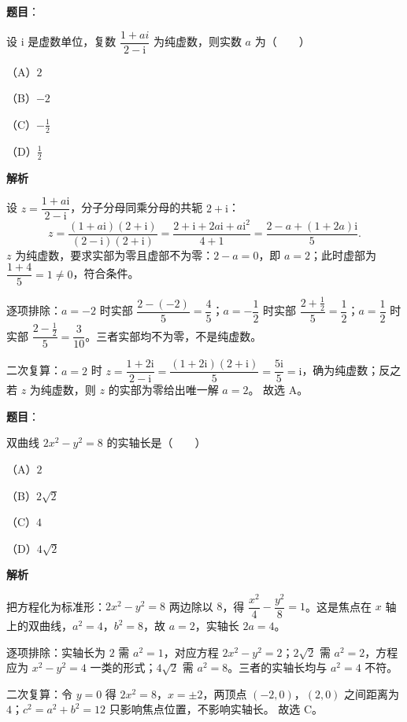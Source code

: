 \begin{answer}

\textbf{题目}：

设 $\mathrm i$ 是虚数单位，复数 $\dfrac{1+ai}{2-\mathrm i}$ 为纯虚数，则实数 $a$ 为\mbox{（　　）}

（A）$2$

（B）$-2$

（C）$-\frac12$

（D）$\frac12$

\textbf{解析}

设 $z=\dfrac{1+a\mathrm i}{2-\mathrm i}$，分子分母同乘分母的共轭 $2+\mathrm i$：
\nopagebreak[4]
\[z=\frac{(1+a\mathrm i)(2+\mathrm i)}{(2-\mathrm i)(2+\mathrm i)}=\frac{2+\mathrm i+2a\mathrm i+a\mathrm i^2}{4+1}=\frac{2-a+(1+2a)\mathrm i}{5}.\]
$z$ 为纯虚数，要求实部为零且虚部不为零：$2-a=0$，即 $a=2$；此时虚部为 $\dfrac{1+4}{5}=1\neq0$，符合条件。

逐项排除：$a=-2$ 时实部 $\dfrac{2-(-2)}{5}=\dfrac45$；$a=-\dfrac12$ 时实部 $\dfrac{2+\frac12}{5}=\dfrac12$；$a=\dfrac12$ 时实部 $\dfrac{2-\frac12}{5}=\dfrac{3}{10}$。三者实部均不为零，不是纯虚数。

二次复算：$a=2$ 时 $z=\dfrac{1+2\mathrm i}{2-\mathrm i}=\dfrac{(1+2\mathrm i)(2+\mathrm i)}{5}=\dfrac{5\mathrm i}{5}=\mathrm i$，确为纯虚数；反之若 $z$ 为纯虚数，则 $z$ 的实部为零给出唯一解 $a=2$。
故选 A。


\end{answer}
\begin{answer}

\textbf{题目}：

双曲线 $2x^2-y^2=8$ 的实轴长是\mbox{（　　）}

（A）$2$

（B）$2\sqrt2$

（C）$4$

（D）$4\sqrt2$

\textbf{解析}

把方程化为标准形：$2x^2-y^2=8$ 两边除以 $8$，得 $\dfrac{x^2}{4}-\dfrac{y^2}{8}=1$。这是焦点在 $x$ 轴上的双曲线，$a^2=4$，$b^2=8$，故 $a=2$，实轴长 $2a=4$。

逐项排除：实轴长为 $2$ 需 $a^2=1$，对应方程 $2x^2-y^2=2$；$2\sqrt2$ 需 $a^2=2$，方程应为 $x^2-y^2=4$ 一类的形式；$4\sqrt2$ 需 $a^2=8$。三者的实轴长均与 $a^2=4$ 不符。

二次复算：令 $y=0$ 得 $2x^2=8$，$x=\pm2$，两顶点 $(-2,0)$，$(2,0)$ 之间距离为 $4$；$c^2=a^2+b^2=12$ 只影响焦点位置，不影响实轴长。
故选 C。


\end{answer}
